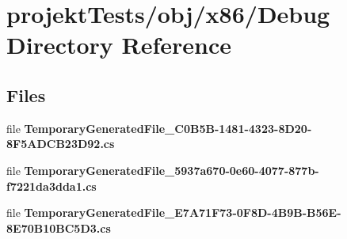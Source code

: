 \section{projekt\+Tests/obj/x86/\+Debug Directory Reference}
\label{dir_dc5de60f5dd9dd2c85e37b7a176e2854}
\subsection*{Files}
\begin{DoxyCompactItemize}
\item 
file \textbf{ Temporary\+Generated\+File\+\_\+C0\+B5\+B-\/1481-\/4323-\/8\+D20-\/8\+F5\+A\+D\+C\+B23\+D92.\+cs}
\item 
file \textbf{ Temporary\+Generated\+File\+\_\+5937a670-\/0e60-\/4077-\/877b-\/f7221da3dda1.\+cs}
\item 
file \textbf{ Temporary\+Generated\+File\+\_\+\+E7\+A71\+F73-\/0\+F8\+D-\/4\+B9\+B-\/\+B56\+E-\/8\+E70\+B10\+B\+C5\+D3.\+cs}
\end{DoxyCompactItemize}
